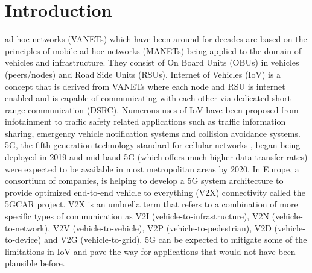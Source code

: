 \documentclass[journal]{IEEEtran}
\begin{document}
%
\IEEEpeerreviewmaketitle



\section{Introduction}

% 
% 
% 
% 
 ad-hoc networks (VANETs) which have been around for decades are based on the principles of mobile ad-hoc networks (MANETs) being applied to the domain of vehicles and infrastructure. They consist of On Board Units (OBUs) in vehicles (peers/nodes) and Road Side Units (RSUs). Internet of Vehicles (IoV) is a concept that is derived from VANETs where each node and RSU is internet enabled and is capable of communicating with each other via dedicated short-range communication (DSRC). Numerous uses of IoV have been proposed from infotainment to traffic safety related applications such as traffic information sharing, emergency vehicle notification systems and collision avoidance systems.
\\5G, the fifth generation technology standard for cellular networks \cite{c:INTERNET_5garticle}, began being deployed in 2019 and mid-band 5G (which offers much higher data transfer rates) were expected to be available in most metropolitan areas by 2020. In Europe, a consortium of companies, is helping to develop a 5G system architecture to provide optimized end-to-end vehicle to everything (V2X) connectivity called the 5GCAR project.
V2X is an umbrella term that refers to a combination of more specific types of communication as V2I (vehicle-to-infrastructure), V2N (vehicle-to-network), V2V (vehicle-to-vehicle), V2P (vehicle-to-pedestrian), V2D (vehicle-to-device) and V2G (vehicle-to-grid). 5G can be expected to mitigate some of the limitations in IoV and pave the way for applications that would not have been plausible before.
\end{document}
